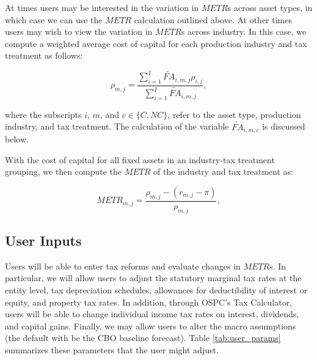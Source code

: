 \documentclass[article,11pt,letterpaper,fleqn]{article}
\theoremstyle{definition}
\numberwithin{equation}{section}
\begin{document}
At times users may be interested in the variation in $METR$s across asset types, in which case we can use the $METR$ calculation outlined above. At other times users may wish to view the variation in $METR$s across industry.  In this case, we compute a weighted average cost of capital for each production industry and tax treatment as follows:

\begin{equation}
\rho_{m,j} = \frac{\sum_{i=1}^{I}\widetilde{FA}_{i,m,j}\rho_{i,j}}{\sum_{i=1}^{I}\widetilde{FA}_{i,m,j}} ,
\end{equation}

\noindent\noindent where the subscripts $i$, $m$, and $c\in\{C,NC\}$, refer to the asset type, production industry, and tax treatment.  The calculation of the variable $\widetilde{FA}_{i,m,c}$ is discussed below.

With the cost of capital for all fixed assets in an industry-tax treatment grouping, we then compute the $METR$ of the industry and tax treatment as:

\begin{equation}
METR_{m,j} =  \frac{\rho_{m,j} - (r_{m,j}-\pi)}{\rho_{m,j}},
\end{equation}

\subsection{User Inputs}

Users will be able to enter tax reforms and evaluate changes in $METR$s.  In particular, we will allow users to adjust the statutory marginal tax rates at the entity level, tax depreciation schedules, allowances for deductibility of interest or equity, and property tax rates.  In addition, through OSPC's Tax Calculator, users will be able to change individual income tax rates on interest, dividends, and capital gains. Finally, we may allow users to alter the macro assumptions (the default with be the CBO baseline forecast).  Table \ref{tab:user_params} summarizes these parameters that the user might adjust.
\end{document}
